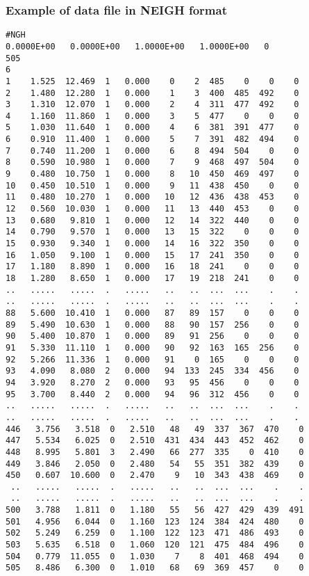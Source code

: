 \documentclass{article}
\begin{document}
\subsubsection[Example of data file in NEIGH format]{Example of data file in NEIGH format}
\begin{small}

\begin{lstlisting}
#NGH
0.0000E+00   0.0000E+00   1.0000E+00   1.0000E+00   0
505
6
1    1.525  12.469  1   0.000    0    2  485    0    0    0
2    1.480  12.280  1   0.000    1    3  400  485  492    0
3    1.310  12.070  1   0.000    2    4  311  477  492    0
4    1.160  11.860  1   0.000    3    5  477    0    0    0
5    1.030  11.640  1   0.000    4    6  381  391  477    0
6    0.910  11.400  1   0.000    5    7  391  482  494    0
7    0.740  11.200  1   0.000    6    8  494  504    0    0
8    0.590  10.980  1   0.000    7    9  468  497  504    0
9    0.480  10.750  1   0.000    8   10  450  469  497    0
10   0.450  10.510  1   0.000    9   11  438  450    0    0
11   0.480  10.270  1   0.000   10   12  436  438  453    0
12   0.560  10.030  1   0.000   11   13  440  453    0    0
13   0.680   9.810  1   0.000   12   14  322  440    0    0
14   0.790   9.570  1   0.000   13   15  322    0    0    0
15   0.930   9.340  1   0.000   14   16  322  350    0    0
16   1.050   9.100  1   0.000   15   17  241  350    0    0
17   1.180   8.890  1   0.000   16   18  241    0    0    0
18   1.280   8.650  1   0.000   17   19  218  241    0    0
..   .....   .....  .   .....   ..   ..  ...  ...    .    .
..   .....   .....  .   .....   ..   ..  ...  ...    .    .
88   5.600  10.410  1   0.000   87   89  157    0    0    0
89   5.490  10.630  1   0.000   88   90  157  256    0    0
90   5.400  10.870  1   0.000   89   91  256    0    0    0
91   5.330  11.110  1   0.000   90   92  163  165  256    0
92   5.266  11.336  1   0.000   91    0  165    0    0    0
93   4.090   8.080  2   0.000   94  133  245  334  456    0
94   3.920   8.270  2   0.000   93   95  456    0    0    0
95   3.700   8.440  2   0.000   94   96  312  456    0    0
..   .....   .....  .   .....   ..   ..  ...  ...    .    .
..   .....   .....  .   .....   ..   ..  ...  ...    .    .
446   3.756   3.518  0   2.510   48   49  337  367  470    0
447   5.534   6.025  0   2.510  431  434  443  452  462    0
448   8.995   5.801  3   2.490   66  277  335    0  410    0
449   3.846   2.050  0   2.480   54   55  351  382  439    0
450   0.607  10.600  0   2.470    9   10  343  438  469    0
 ..   .....   .....  .   .....   ..   ..  ...  ...    .    .
 ..   .....   .....  .   .....   ..   ..  ...  ...    .    .
500   3.788   1.811  0   1.180   55   56  427  429  439  491
501   4.956   6.044  0   1.160  123  124  384  424  480    0
502   5.249   6.259  0   1.100  122  123  471  486  493    0
503   5.635   6.518  0   1.060  120  121  475  484  496    0
504   0.779  11.055  0   1.030    7    8  401  468  494    0
505   8.486   6.300  0   1.010   68   69  369  457    0    0
\end{lstlisting}
\end{small}
\end{document}
